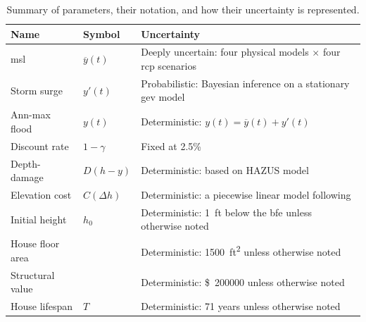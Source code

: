 \documentclass[11pt]{article}
\newcommand{\usd}[1]{\SI{#1}[\$]{}}
\begin{document}
\begin{table}
    \centering
    \caption{
        Summary of parameters, their notation, and how their uncertainty is represented.
    }\label{tab:uncertainties}
    \small
    \begin{tabular}{l l p{3.5in}}
        \toprule
        Name             & Symbol            & Uncertainty                                                                          \\
        \midrule
        \Gls{msl}        & $\overline{y}(t)$ & Deeply uncertain: four physical models $\times$ four \acrshort{rcp} scenarios        \\
        Storm surge      & $y'(t)$           & Probabilistic: Bayesian inference on a stationary \acrshort{gev} model               \\
        Ann-max flood    & $y(t)$            & Deterministic: $y(t)=\overline{y}(t)+y'(t)$                                          \\
        Discount rate    & $1-\gamma$        & Fixed at 2.5\%                                                                       \\
        Depth-damage     & $D(h-y)$          & Deterministic: based on HAZUS model                                                  \\
        Elevation cost   & $C(\Delta h)$     & Deterministic: a piecewise linear model following \citet{zarekarizi_suboptimal:2020} \\
        Initial height   & $h_0$             & Deterministic: \SI{1}{ft} below the \gls{bfe} unless otherwise noted                 \\
        House floor area &                   & Deterministic: \SI{1500}{ft^2} unless otherwise noted                                \\
        Structural value &                   & Deterministic: \usd{200000} unless otherwise noted                                   \\
        House lifespan   & $T$               & Deterministic: 71 years unless otherwise noted                                       \\
        \bottomrule
    \end{tabular}
\end{table}
\end{document}
